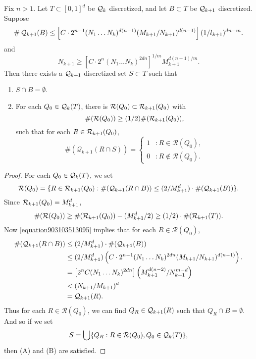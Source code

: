 \begin{lemma} \label{Lemma1209410535}
    Fix $n > 1$. Let $T \subset [0,1]^d$ be $\operatorname{\mathcal{Q}}_k$ discretized, and let $B \subset T$ be $\operatorname{\mathcal{Q}}_{k+1}$ discretized. Suppose
    \[ \# \operatorname{\mathcal{Q}}_{k+1}(B) \leq \left[ C \cdot 2^{n-1} (N_1 \dots N_k)^{d(n-1)} (M_{k+1}/N_{k+1})^{d(n-1)} \right] (1/l_{k+1})^{dn - m}. \]
    and
    \begin{equation} \label{equation903103513095}
        N_{k+1} \geq \left[ C \cdot 2^n (N_1 \dots N_k)^{2dn} \right]^{1/m} M_{k+1}^{d(n-1)/m}.
    \end{equation}
    Then there exists a $\operatorname{\mathcal{Q}}_{k+1}$ discretized set $S \subset T$ such that
    \begin{enumerate}
        \item $S \cap B = \emptyset$.
        \item \label{badsetproperty5} For each $Q_0 \in \operatorname{\mathcal{Q}}_k(T)$, there is $\mathcal{R}(Q_0) \subset \operatorname{\mathcal{R}}_{k+1}(Q_0)$ with
        \[ \#(\mathcal{R}(Q_0)) \geq (1/2) \#(\operatorname{\mathcal{R}}_{k+1}(Q_0)), \]
        such that for each $R \in \operatorname{\mathcal{R}}_{k+1}(Q_0)$,
        \[ \#(\mathcal{Q}_{k+1}(R \cap S)) = \begin{cases} 1 &: R \in \mathcal{R}(Q_0), \\ 0 &: R \not \in \mathcal{R}(Q_0). \end{cases} \]
    \end{enumerate}
\end{lemma}
\begin{proof}
    For each $Q_0 \in \operatorname{\mathcal{Q}}_k(T)$, we set
    \[ \mathcal{R}(Q_0) = \{ R \in \operatorname{\mathcal{R}}_{k+1}(Q_0) : \#(\operatorname{\mathcal{Q}}_{k+1}(R \cap B)) \leq (2/M_{k+1}^d) \cdot \#(\operatorname{\mathcal{Q}}_{k+1}(B)) \}. \]
    Since $\operatorname{\mathcal{R}}_{k+1}(Q_0) = M_{k+1}^d$,
    \[ \#(\mathcal{R}(Q_0)) \geq \#(\operatorname{\mathcal{R}}_{k+1}(Q_0)) - (M_{k+1}^d/2) \geq (1/2) \cdot \#(\operatorname{\mathcal{R}}_{k+1}(T)). \]
    Now \eqref{equation903103513095} implies that for each $R \in \mathcal{R}(Q_0)$,
    \begin{align*}
        \#(\operatorname{\mathcal{Q}}_{k+1}(R \cap B)) &\leq (2/M_{k+1}^d) \cdot \#(\operatorname{\mathcal{Q}}_{k+1}(B))\\
        &\leq (2/M_{k+1}^d) \left(C \cdot 2^{n-1} (N_1 \dots N_k)^{2dn} (M_{k+1}/N_{k+1})^{d(n-1)} \right).\\
        &= \left[ 2^n C (N_1 \dots N_k)^{2dn} \right] \left( M_{k+1}^{d(n-2)} / N_{k+1}^{m-d} \right)\\
        &< (N_{k+1}/M_{k+1})^d\\
        &= \operatorname{\mathcal{Q}}_{k+1}(R).
    \end{align*}
    Thus for each $R \in \mathcal{R}(Q_0)$, we can find $Q_R \in \operatorname{\mathcal{Q}}_{k+1}(R)$ such that $Q_R \cap B = \emptyset$. And so if we set
    \[ S = \bigcup \{ Q_R : R \in \mathcal{R}(Q_0), Q_0 \in \operatorname{\mathcal{Q}}_k(T) \}, \]
    then (A) and (B) are satisfied.
\end{proof}

